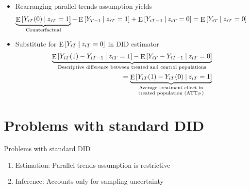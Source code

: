 \documentclass[table, xcolor = {dvipsnames}, 9pt]{beamer}
\newcommand\given[1][]{\:#1\vert\:}
\theoremstyle{plain}
\DeclareMathOperator{\E}{\rm{E}}
\begin{document}
\begin{frame}[t]
\begin{itemize}
{
} \normalsize
\vspace{-1em}
\item Rearranging parallel trends assumption yields
\small
\vspace{0.75em}
\begin{align*}
\underbrace{\E\left[Y_{iT}(0) \given z_{iT} = 1\right]}_{\text{Counterfactual}} - \E\left[Y_{T-1} \given z_{iT} = 1 \right]+ \E\left[Y_{iT-1} \given z_{iT} = 0\right] & = \E\left[Y_{iT} \given z_{iT} = 0\right]
\end{align*}
\normalsize
\vspace{0.75em}
\item \pause Substitute for $\E\left[Y_{iT} \given z_{iT} = 0\right]$ in DID estimator \pause
\small\begin{align*}
\underbrace{\E\left[Y_{iT}(1) - Y_{iT-1} \given z_{iT} = 1\right] - \E\left[Y_{iT} - Y_{iT-1} \given z_{iT} = 0\right]}_{\text{Descriptive difference between treated and control populations}} \\ = \underbrace{\E\left[Y_{iT}(1) - Y_{iT}(0) \given z_{iT} = 1\right]}_{\substack{\text{Average treatment effect in} \\ \text{treated population } (\text{ATT}_{\mathcal{P}})}}
\end{align*} 
\normalsize
\end{itemize}
\end{frame}
\section{Problems with standard DID}
\begin{frame}{Problems with standard DID}
\begin{enumerate}
\item Estimation: Parallel trends assumption is restrictive
\item \pause Inference: Accounts only for sampling uncertainty
\end{enumerate}
\end{frame}
\end{document}
